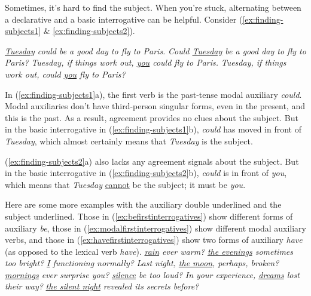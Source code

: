 \begin{tcolorbox}[title=Identifying the subject, colback=white, parbox]\label{box:finding-subject}
\setlength{\parindent}{1.5em}
    \noindent Sometimes, it's hard to find the subject. When you're stuck, alternating between a declarative and a basic interrogative can be helpful. Consider (\ref{ex:finding-subjects1} \& \ref{ex:finding-subjects2}).

    \ea \label{ex:finding-subjects1}
    \ea \textit{\uline{Tuesday} could be a good day to fly to Paris.}
        \ex \textit{Could \uline{Tuesday} be a good day to fly to Paris?}
        \z
    \z
    \ea \label{ex:finding-subjects2}
        \ea \textit{Tuesday, if things work out, \uline{you} could fly to Paris.}
        \ex \textit{Tuesday, if things work out, could \uline{you} fly to Paris?}
        \z
    \z

    In (\ref{ex:finding-subjects1}a), the first verb is the past-tense modal auxiliary \textit{could}. Modal auxiliaries don't have third-person singular forms, even in the present, and this is the past. As a result, agreement provides no clues about the subject. But in the basic interrogative in (\ref{ex:finding-subjects1}b), \textit{could} has moved in front of \textit{Tuesday}, which almost certainly means that \textit{Tuesday} is the subject.
    
    (\ref{ex:finding-subjects2}a) also lacks any agreement signals about the subject. But in the basic interrogative in (\ref{ex:finding-subjects2}b), \textit{could} is in front of \textit{you}, which means that \textit{Tuesday} \uline{cannot} be the subject; it must be \textit{you}.
    
\end{tcolorbox}

Here are some more examples with the auxiliary double underlined and the subject underlined. Those in (\ref{ex:befirstinterrogatives}) show different forms of auxiliary \textit{be}, those in (\ref{ex:modalfirstinterrogatives}) show different modal auxiliary verbs, and those in (\ref{ex:havefirstinterrogatives}) show two forms of auxiliary \textit{have} (as opposed to the lexical verb \textit{have}).
\ea \label{ex:befirstinterrogatives}
    \ea \textit{ \uline{rain} ever warm?}
        \ex \textit{ \uline{the evenings} sometimes too bright?}
        \ex \textit{ \uline{I} functioning normally?}
        \ex \textit{Last night,  \uline{the moon}, perhaps, broken?}
    \z
\z
\ea \label{ex:modalfirstinterrogatives}
    \ea \textit{ \uline{mornings} ever surprise you?}
        \ex \textit{ \uline{silence} be too loud?}
    \z
\z
\ea\label{ex:havefirstinterrogatives}
    \ea \textit{In your experience,  \uline{dreams} lost their way?} 
    \ex \textit{ \uline{the silent night} revealed its secrets before?} 
    \z
\z

